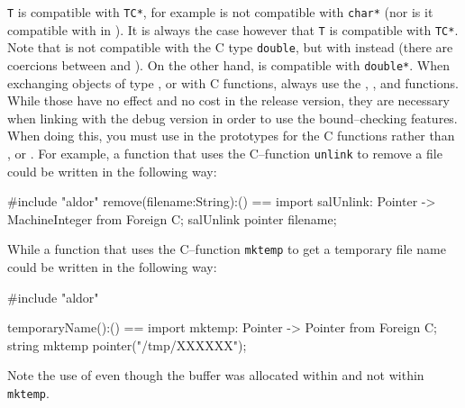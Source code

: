  {\tt T} is compatible with {\tt TC*}, for
example   is not compatible
with {\tt char*} (nor is it compatible with  in \libaldor).
It is always the case however that  {\tt T}
is compatible with {\tt TC*}.
Note that  is not compatible with
the C type {\tt double}, but with
 instead (there are coercions between
 and ).
On the other hand,  
is compatible with {\tt double*}.
When exchanging objects of type ,
 or 
with C functions, always use the ,
,  and
 functions. While those have no effect and
no cost in the release version, they are necessary when linking with
the debug version in order to use the bound--checking features.
When doing this, you must use  in the prototypes for
the C functions rather than ,
 or .
For example, a function that uses the C--function {\tt unlink} to
remove a file could be written in the following way:
\begin{ttyout}
#include "aldor"
remove(filename:String):() == {
	import { salUnlink: Pointer -> MachineInteger } from Foreign C;
	salUnlink pointer filename;
}
\end{ttyout}
\noindent
While a function that uses the C--function {\tt mktemp} to get a
temporary file name could be written in the following way:
\begin{ttyout}
#include "aldor"

temporaryName():() == {
	import { mktemp: Pointer -> Pointer } from Foreign C;
	string mktemp pointer("/tmp/XXXXXX");
}
\end{ttyout}
\noindent
Note the use of  even though the buffer was
allocated within \libaldor{} and not within {\tt mktemp}.

